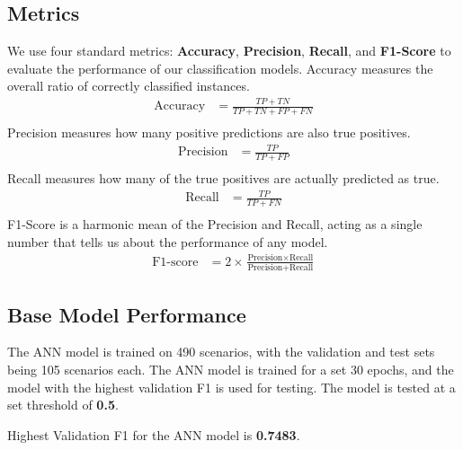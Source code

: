 \documentclass[final,5p,times,twocolumn,authoryear]{elsarticle}
\begin{document}
\subsection{Metrics}

We use four standard metrics: \textbf{Accuracy}, \textbf{Precision}, \textbf{Recall}, and \textbf{F1-Score} to evaluate the performance of our classification models.
\vspace{0.1cm}
\newline Accuracy measures the overall ratio of correctly classified instances.
\begin{align}
    \text{Accuracy} &= \frac{TP + TN}{TP + TN + FP + FN} \\[6pt]
\end{align}
\newline Precision measures how many positive predictions are also true positives.
\begin{align}
    \text{Precision} &= \frac{TP}{TP + FP} \\[6pt]
\end{align}
\newline Recall measures how many of the true positives are actually predicted as true.
\begin{align}
    \text{Recall} &= \frac{TP}{TP + FN} \\[6pt]
\end{align}
\newline F1-Score is a harmonic mean of the Precision and Recall, acting as a single number that tells us about the performance of any model.
\begin{align}
    \text{F1-score} &= 2 \times \frac{\text{Precision} \times \text{Recall}}{\text{Precision} + \text{Recall}}
\end{align}

\subsection{Base Model Performance}

The ANN model is trained on 490 scenarios, with the validation and test sets being 105 scenarios each. The ANN model is trained for a set 30 epochs, and the model with the highest validation F1 is used for testing. The model is tested at a set threshold of \textbf{0.5}.

Highest Validation F1 for the ANN model is \textbf{0.7483}.

\vspace{0.03cm}
\end{document}
